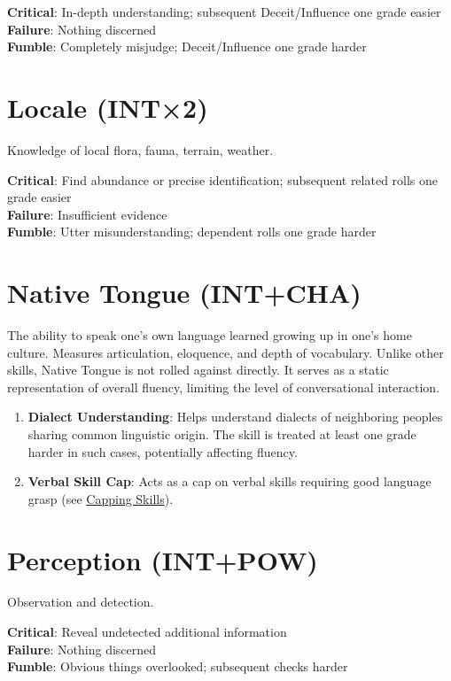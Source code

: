 \documentclass[10pt]{article}
\begin{document}
\textbf{Critical}: In-depth understanding; subsequent Deceit/Influence one grade easier\\
\textbf{Failure}: Nothing discerned\\
\textbf{Fumble}: Completely misjudge; Deceit/Influence one grade harder

\section{Locale (INT×2)}
\label{skill:locale}

Knowledge of local flora, fauna, terrain, weather.

\textbf{Critical}: Find abundance or precise identification; subsequent related rolls one grade easier\\
\textbf{Failure}: Insufficient evidence\\
\textbf{Fumble}: Utter misunderstanding; dependent rolls one grade harder

\section{Native Tongue (INT+CHA)}
\label{skill:nativetongue}

The ability to speak one's own language learned growing up in one's home culture. Measures articulation, eloquence, and depth of vocabulary. Unlike other skills, Native Tongue is not rolled against directly. It serves as a static representation of overall fluency, limiting the level of conversational interaction.

\begin{enumerate}
    \item \textbf{Dialect Understanding}: Helps understand dialects of neighboring peoples sharing common linguistic origin. The skill is treated at least one grade harder in such cases, potentially affecting fluency.
    \item \textbf{Verbal Skill Cap}: Acts as a cap on verbal skills requiring good language grasp (see \hyperref[sec:cap]{Capping Skills}).
\end{enumerate}


\section{Perception (INT+POW)}
\label{skill:perception}

Observation and detection.

\textbf{Critical}: Reveal undetected additional information\\
\textbf{Failure}: Nothing discerned\\
\textbf{Fumble}: Obvious things overlooked; subsequent checks harder
\end{document}
